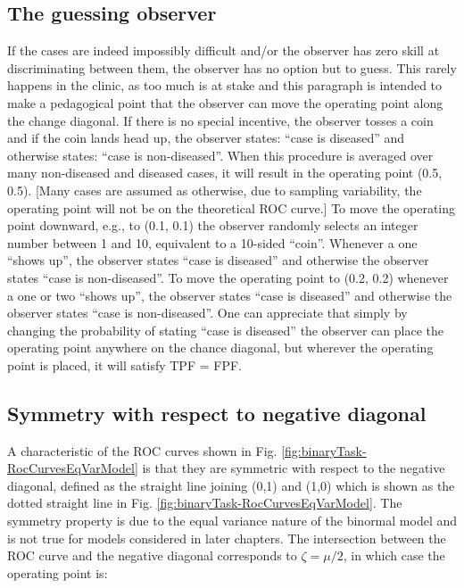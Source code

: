 \documentclass[
]{book}
\begin{document}
\hypertarget{the-guessing-observer}{%
\subsection{The guessing observer}\label{the-guessing-observer}}

If the cases are indeed impossibly difficult and/or the observer has zero skill at discriminating between them, the observer has no option but to guess. This rarely happens in the clinic, as too much is at stake and this paragraph is intended to make a pedagogical point that the observer can move the operating point along the change diagonal. If there is no special incentive, the observer tosses a coin and if the coin lands head up, the observer states: ``case is diseased'' and otherwise states: ``case is non-diseased''. When this procedure is averaged over many non-diseased and diseased cases, it will result in the operating point (0.5, 0.5). {[}Many cases are assumed as otherwise, due to sampling variability, the operating point will not be on the theoretical ROC curve.{]} To move the operating point downward, e.g., to (0.1, 0.1) the observer randomly selects an integer number between 1 and 10, equivalent to a 10-sided ``coin''. Whenever a one ``shows up'', the observer states ``case is diseased'' and otherwise the observer states ``case is non-diseased''. To move the operating point to (0.2, 0.2) whenever a one or two ``shows up'', the observer states ``case is diseased'' and otherwise the observer states ``case is non-diseased''. One can appreciate that simply by changing the probability of stating ``case is diseased'' the observer can place the operating point anywhere on the chance diagonal, but wherever the operating point is placed, it will satisfy TPF = FPF.

\hypertarget{symmetry-with-respect-to-negative-diagonal}{%
\subsection{Symmetry with respect to negative diagonal}\label{symmetry-with-respect-to-negative-diagonal}}

A characteristic of the ROC curves shown in Fig. \ref{fig:binaryTask-RocCurvesEqVarModel} is that they are symmetric with respect to the negative diagonal, defined as the straight line joining (0,1) and (1,0) which is shown as the dotted straight line in Fig. \ref{fig:binaryTask-RocCurvesEqVarModel}. The symmetry property is due to the equal variance nature of the binormal model and is not true for models considered in later chapters. The intersection between the ROC curve and the negative diagonal corresponds to \(\zeta = \mu/2\), in which case the operating point is:
\end{document}

